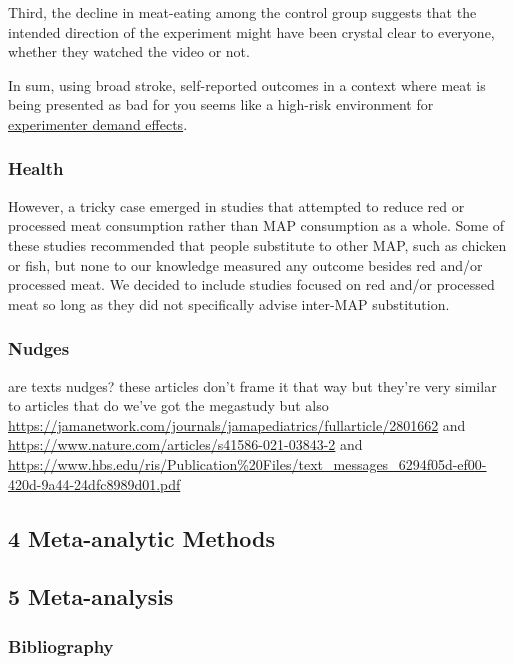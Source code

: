 \documentclass[
  man]{apa6}
\begin{document}
Third, the decline in meat-eating among the control group suggests that the intended direction of the experiment might have been crystal clear to everyone, whether they watched the video or not.

In sum, using broad stroke, self-reported outcomes in a context where meat is being presented as bad for you seems like a high-risk environment for \href{https://www.elgaronline.com/display/edcoll/9781788110556/9781788110556.00031.xml}{experimenter demand effects}.

\subsubsection{Health}\label{health-1}

However, a tricky case emerged in studies that attempted to reduce red or processed meat consumption rather than MAP consumption as a whole. Some of these studies recommended that people substitute to other MAP, such as chicken or fish, but none to our knowledge measured any outcome besides red and/or processed meat. We decided to include studies focused on red and/or processed meat so long as they did not specifically advise inter-MAP substitution.

\subsubsection{Nudges}\label{nudges}

are texts nudges? these articles don't frame it that way but they're very similar to articles that do we've got the megastudy but also \url{https://jamanetwork.com/journals/jamapediatrics/fullarticle/2801662} and \url{https://www.nature.com/articles/s41586-021-03843-2} and \url{https://www.hbs.edu/ris/Publication\%20Files/text_messages_6294f05d-ef00-420d-9a44-24dfc8989d01.pdf}

\subsection{4 Meta-analytic Methods}\label{meta-analytic-methods}

\subsection{5 Meta-analysis}\label{meta-analysis}

\subsubsection*{Bibliography}\label{bibliography}
\end{document}
